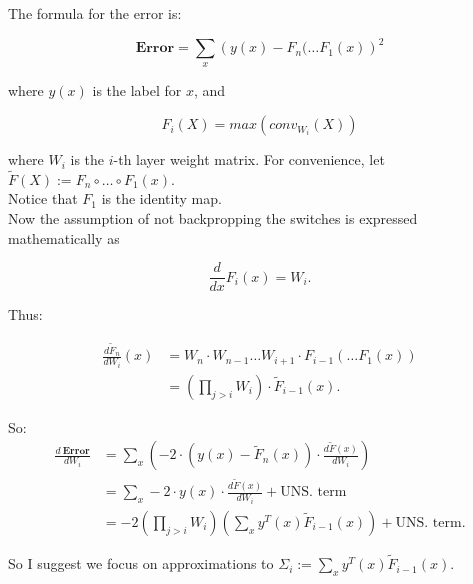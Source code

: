\documentclass[11pt]{article}
\title{}
\author{}
\date{}
\begin{document}

\maketitle

\thispagestyle{empty}

The formula for the error is:

$$\textbf{Error} = \sum_{x} \left (y(x) - F_n( \ldots F_1(x) \right)^2$$

where $y(x)$ is the label for $x$, and 

$$F_i(X) = max(conv_{W_i}(X))$$

where $W_i$ is the $i$-th layer weight matrix.   For convenience, let $\tilde{F}(X) := F_n \circ \ldots \circ F_1 (x)$. \\

Notice that $F_1$ is the identity map. \\

Now the assumption of not backpropping the switches is expressed mathematically as

$$\frac{d}{dx}F_i(x) = W_i.$$

Thus:

\begin{eqnarray*}
\frac{d \tilde{F}_n}{d W_i}(x) & = W_n \cdot W_{n-1} \ldots W_{i+1} \cdot F_{i-1}( \ldots F_1(x)) \\
                            & = \left( \prod_{j > i} W_i \right) \cdot \tilde{F}_{i-1}(x).
\end{eqnarray*}                 
                 
So:                        
\begin{eqnarray*}
\frac{d\ \mathbf{Error}}{d W_i} & = \sum_x \left ( -2 \cdot (y(x) - \tilde{F}_n(x)) \cdot \frac{d\tilde{F}(x)}{dW_i} \right ) \\     
                      & = \sum_x -2 \cdot y(x) \cdot  \frac{d\tilde{F}(x)}{dW_i} + \text{UNS. term} \\
                      & = -2 \left(\prod_{j > i} W_i \right) \left(\sum_x y^T(x) \tilde{F}_{i-1}(x) \right) + \text{UNS. term}.
\end{eqnarray*}

So I suggest we focus on approximations to $\Sigma_{i} := \sum_x y^T(x) \tilde{F}_{i-1}(x)$.

\newpage

\footnotesize{

\linespread{0.9}

}
\end{document}
